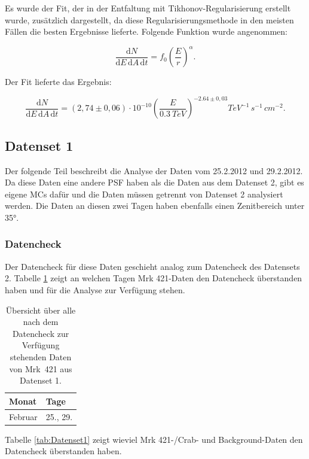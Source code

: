 Es wurde der Fit, der in der Entfaltung mit Tikhonov-Regularisierung erstellt wurde, zusätzlich dargestellt, da diese Regularisierungsmethode in den meisten Fällen die besten Ergebnisse lieferte.
Folgende Funktion wurde angenommen:

\begin{equation}
 \frac{\mathrm{d}N}{\mathrm{d}E\,\mathrm{d}A\,\mathrm{d}t}=f_0\left( \frac{E}{r} \right)^\alpha.
\end{equation}

Der Fit lieferte das Ergebnis:

\begin{equation}
 \frac{\mathrm{d}N}{\mathrm{d}E\,\mathrm{d}A\,\mathrm{d}t}=(2,74 \pm 0,06) \cdot 10^{-10}\left( \frac{E}{\SI{0,3}{TeV}} \right)^{-2.64 \pm 0,03} \si{TeV^{-1}\,s^{-1}\,cm^{-2}}.
\end{equation}


\FloatBarrier

\subsection{Datenset 1}
\label{subsec:Datenset_1}
Der folgende Teil beschreibt die Analyse der Daten vom 25.2.2012 und 29.2.2012.
Da diese Daten eine andere PSF haben als die Daten aus dem Datenset 2, gibt es eigene MCs dafür und die Daten müssen getrennt von Datenset 2 analysiert werden.
Die Daten an diesen zwei Tagen haben ebenfalls einen Zenitbereich unter 35°.

\subsubsection{Datencheck}
Der Datencheck für diese Daten geschieht analog zum Datencheck des Datensets 2. 
Tabelle \ref{tab:Datenset1-Mrk421} zeigt an welchen Tagen Mrk 421-Daten den Datencheck überstanden haben und für die Analyse zur Verfügung stehen. 

\begin{table}[!h]
\centering
\caption{Übersicht über alle nach dem Datencheck zur Verfügung stehenden Daten von Mrk~421 aus Datenset 1.}
\label{tab:Datenset1-Mrk421}
\begin{tabular}{ll}
  \toprule
  Monat & Tage\\
  \midrule
  \midrule
Februar & 25., 29.\\
  \bottomrule
\end{tabular}
\end{table}


Tabelle \ref{tab:Datenset1} zeigt wieviel Mrk 421-/Crab- und Background-Daten den Datencheck überstanden haben.


